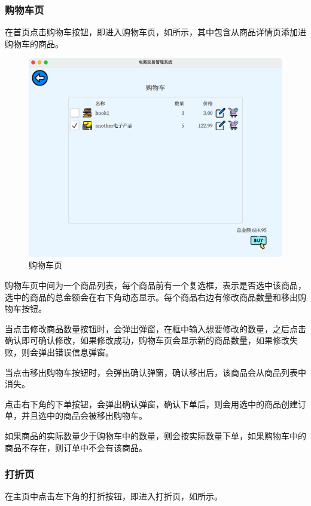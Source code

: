 \documentclass[lang=cn,11pt,a4paper,cite=authornum]{paper}
\begin{document}
\subsubsection{购物车页}

在首页点击购物车按钮，即进入购物车页，如所示，其中包含从商品详情页添加进购物车的商品。

\begin{figure}[htbp]
    \centering
    \includegraphics[width=0.7\linewidth]{./Images/cart.png}
    \caption{购物车页\label{fig:cart}}
\end{figure}

购物车页中间为一个商品列表，每个商品前有一个复选框，表示是否选中该商品，选中的商品的总金额会在右下角动态显示。每个商品右边有修改商品数量和移出购物车按钮。

当点击修改商品数量按钮时，会弹出弹窗，在框中输入想要修改的数量，之后点击确认即可确认修改，如果修改成功，购物车页会显示新的商品数量，如果修改失败，则会弹出错误信息弹窗。

当点击移出购物车按钮时，会弹出确认弹窗，确认移出后，该商品会从商品列表中消失。

点击右下角的下单按钮，会弹出确认弹窗，确认下单后，则会用选中的商品创建订单，并且选中的商品会被移出购物车。

如果商品的实际数量少于购物车中的数量，则会按实际数量下单，如果购物车中的商品不存在，则订单中不会有该商品。

\subsubsection{打折页}

在主页中点击左下角的打折按钮，即进入打折页，如所示。
\end{document}
